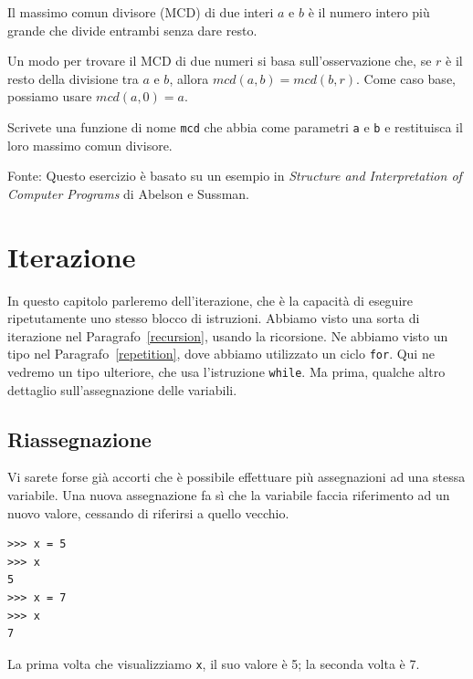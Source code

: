 \documentclass[10pt]{book}
\begin{document}
\vspace{0.2in}
\begin{exercise}

Il massimo comun divisore (MCD) di due interi $a$ e $b$ è il numero intero più grande che divide entrambi senza dare resto.  

Un modo per trovare il MCD di due numeri si basa sull'osservazione che, se $r$ è il resto della divisione tra $a$ e $b$, allora $mcd(a,
b) = mcd(b, r)$.  Come caso base, possiamo usare $mcd(a, 0) = a$.

Scrivete una funzione di nome
\verb"mcd" che abbia come parametri {\tt a} e {\tt b}
e restituisca il loro massimo comun divisore.

Fonte: Questo esercizio è basato su un esempio in {\em Structure and Interpretation of Computer Programs} di Abelson e Sussman.

\end{exercise}


\chapter{Iterazione}

In questo capitolo parleremo dell'iterazione, che è la capacità di eseguire ripetutamente uno stesso blocco di istruzioni. Abbiamo visto una sorta di iterazione nel Paragrafo~\ref{recursion}, usando la ricorsione. Ne abbiamo visto un tipo nel Paragrafo~\ref{repetition}, dove abbiamo utilizzato un ciclo {\tt for}. Qui ne vedremo un tipo ulteriore, che usa l'istruzione {\tt while}. Ma prima, qualche altro dettaglio sull'assegnazione delle variabili.


\section{Riassegnazione}

Vi sarete forse già accorti che è possibile effettuare più assegnazioni ad una stessa variabile. Una nuova assegnazione fa sì che la variabile faccia riferimento ad un nuovo valore, cessando di riferirsi a quello vecchio.

\begin{verbatim}
>>> x = 5
>>> x
5
>>> x = 7
>>> x
7
\end{verbatim}
%
La prima volta che visualizziamo {\tt x}, il suo valore è 5; la seconda volta è 7.
\end{document}
